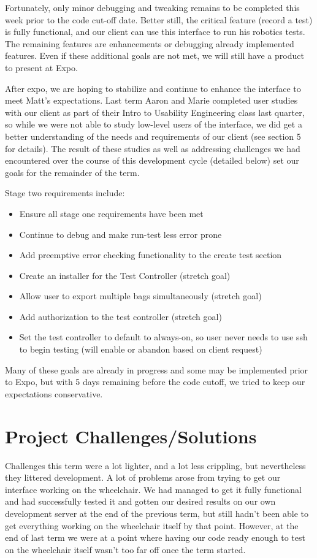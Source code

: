 \documentclass[onecolumn, draftclsnofoot,10pt, compsoc]{IEEEtran}
\begin{document}
Fortunately, only minor debugging and tweaking remains to be completed this week prior to the code cut-off date. Better still, the critical feature (record a test) is fully functional, and our client can use this interface to run his robotics tests. The remaining features are enhancements or debugging already implemented features. Even if these additional goals are not met, we will still have a product to present at Expo.

After expo, we are hoping to stabilize and continue to enhance the interface to meet Matt's expectations. Last term Aaron and Marie completed user studies with our client as part of their Intro to Usability Engineering class last quarter, so while we were not able to study low-level users of the interface, we did get a better understanding of the needs and requirements of our client (see section 5 for details). The result of these studies as well as addressing challenges we had encountered over the course of this development cycle (detailed below) set our goals for the remainder of the term.

Stage two requirements include:
\begin{itemize}
	\item Ensure all stage one requirements have been met
	\item Continue to debug and make run-test less error prone
	\item Add preemptive error checking functionality to the create test section
	\item Create an installer for the Test Controller (stretch goal)
	\item Allow user to export multiple bags simultaneously (stretch goal)
	\item Add authorization to the test controller (stretch goal)
	\item Set the test controller to default to always-on, so user never needs to use ssh to begin testing (will enable or abandon based on client request)
\end{itemize}

Many of these goals are already in progress and some may be implemented prior to Expo, but with 5 days remaining before the code cutoff, we tried to keep our expectations conservative. 
\section{Project Challenges/Solutions}
Challenges this term were a lot lighter, and a lot less crippling, but nevertheless they littered development. A lot of problems arose from trying to get our interface working on the wheelchair. We had managed to get it fully functional and had successfully tested it and gotten our desired results on our own development server at the end of the previous term, but still hadn't been able to get everything working on the wheelchair itself by that point. However, at the end of last term we were at a point where having our code ready enough to test on the wheelchair itself wasn't too far off once the term started.\\
\end{document}

